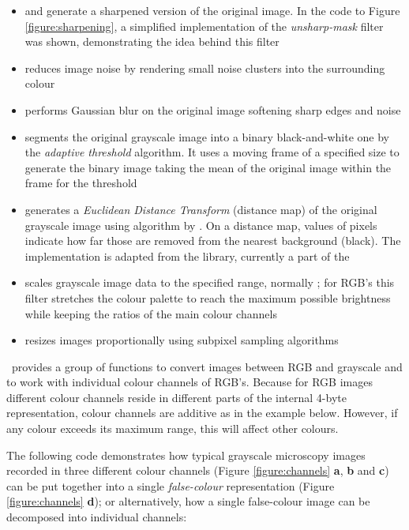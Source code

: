 \begin{itemize}
    \setlength{\itemsep}{0in}
    \item {} and  generate a sharpened version of the original image. In the code to Figure \ref{figure:sharpening}, a simplified implementation of the {\em unsharp-mask} filter was shown, demonstrating the idea behind this filter
    \item {} reduces image noise by rendering small noise clusters into the surrounding colour
    \item {} performs Gaussian blur on the original image softening sharp edges and noise
    \item {} segments the original grayscale image into a binary black-and-white one by the {\em adaptive threshold} algorithm. It uses a moving frame of a specified size to generate the binary image taking the mean of the original image within the frame for the threshold
    \item {} generates a {\em Euclidean Distance Transform} (distance map) of the original grayscale image using algorithm by \citep{R:Lotufo+Zampirolli:2001}. On a distance map, values of pixels indicate how far those are removed from the nearest background (black). The implementation is adapted from the  library, currently a part of the  \citep{R:SIP:2005}
    \item {} scales grayscale image data to the specified range, normally \code{[0..1]}; for RGB's this filter stretches the colour palette to reach the maximum possible brightness while keeping the ratios of the main colour channels
    \item {} resizes images proportionally using subpixel sampling algorithms
\end{itemize}

\EBImage\ provides a group of functions to convert images between RGB and grayscale and to work with individual colour channels of RGB's. Because for RGB images different colour channels reside in different parts of the internal 4-byte representation, colour channels are additive as in the example below. However, if any colour exceeds its maximum range, this will affect other colours.

The following code demonstrates how typical grayscale microscopy images recorded in three different colour channels (Figure \ref{figure:channels} {\bf a}, {\bf b} and {\bf c}) can be put together into a single {\em false-colour} representation (Figure \ref{figure:channels} {\bf d}); or alternatively, how a single false-colour image can be decomposed into individual channels:

